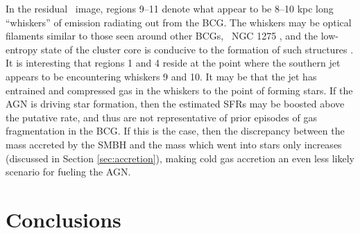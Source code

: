 \documentclass{emulateapj}
\begin{document}
In the residual \myi\ image, regions 9--11 denote what appear to be
8--10 kpc long ``whiskers'' of emission radiating out from the
BCG. The whiskers may be optical filaments similar to those seen
around other BCGs, \eg\ NGC 1275 \citep{2003MNRAS.344L..48F}, and the
low-entropy state of the cluster core is conducive to the formation of
such structures \citep{conduction}. It is interesting that regions 1
and 4 reside at the point where the southern jet appears to be
encountering whiskers 9 and 10. It may be that the jet has entrained
and compressed gas in the whiskers to the point of forming stars. If
the AGN is driving star formation, then the estimated SFRs may be
boosted above the putative rate, and thus are not representative of
prior episodes of gas fragmentation in the BCG. If this is the case,
then the discrepancy between the mass accreted by the SMBH and the
mass which went into stars only increases (discussed in Section
\ref{sec:accretion}), making cold gas accretion an even less likely
scenario for fueling the AGN.

\section{Conclusions}
\label{sec:con}
\end{document}
